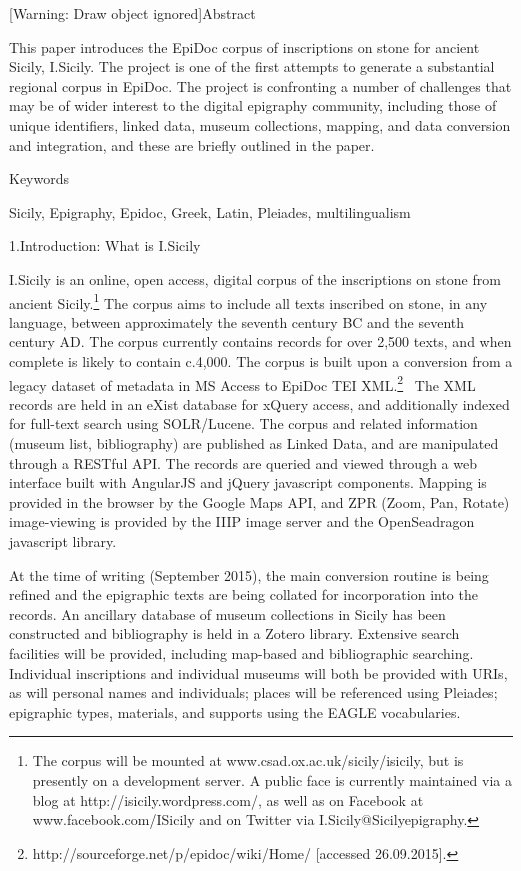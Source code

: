 \documentclass[amsthm,ebook]{saparticle}
\title{}
\title{}
\author{a}
\date{2015-11-18}
\begin{document}
[Warning: Draw object ignored]Abstract

This paper introduces the EpiDoc corpus of inscriptions on stone for ancient Sicily, I.Sicily. The project is one of the
first attempts to generate a substantial regional corpus in EpiDoc. The project is confronting a number of challenges
that may be of wider interest to the digital epigraphy community, including those of unique identifiers, linked data,
museum collections, mapping, and data conversion and integration, and these are briefly outlined in the paper.

Keywords

Sicily, Epigraphy, Epidoc, Greek, Latin, Pleiades, multilingualism


\bigskip

1.Introduction: What is I.Sicily

I.Sicily is an online, open access, digital corpus of the inscriptions on stone from ancient Sicily.\footnote{ The
corpus will be mounted at www.csad.ox.ac.uk/sicily/isicily, but is presently on a development server. A public face is
currently maintained via a blog at http://isicily.wordpress.com/, as well as on Facebook at www.facebook.com/ISicily
and on Twitter via I.Sicily@Sicilyepigraphy.} The corpus aims to include all texts inscribed on stone, in any language,
between approximately the seventh century BC and the seventh century AD. The corpus currently contains records for over
2,500 texts, and when complete is likely to contain c.4,000. The corpus is built upon a conversion from a legacy
dataset of metadata in MS Access to EpiDoc TEI XML.\footnote{ http://sourceforge.net/p/epidoc/wiki/Home/ [accessed
26.09.2015].} \ The XML records are held in an eXist database for xQuery access, and additionally indexed for full-text
search using SOLR/Lucene. The corpus and related information (museum list, bibliography) are published as Linked Data,
and are manipulated through a RESTful API. The records are queried and viewed through a web interface built with
AngularJS and jQuery javascript components. Mapping is provided in the browser by the Google Maps API, and ZPR (Zoom,
Pan, Rotate) image-viewing is provided by the IIIP image server and the OpenSeadragon javascript library.

At the time of writing (September 2015), the main conversion routine is being refined and the epigraphic texts are being
collated for incorporation into the records. An ancillary database of museum collections in Sicily has been constructed
and bibliography is held in a Zotero library. Extensive search facilities will be provided, including map-based and
bibliographic searching. Individual inscriptions and individual museums will both be provided with URIs, as will
personal names and individuals; places will be referenced using Pleiades; epigraphic types, materials, and supports
using the EAGLE vocabularies.
\end{document}
